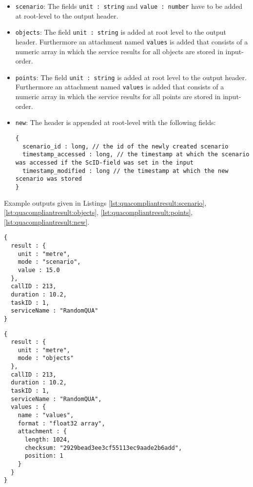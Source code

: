 \begin{itemize}
  \item \texttt{scenario}: The fields \texttt{unit : string} and \texttt{value : number} have to be added at root-level to the output header.

  \item \texttt{objects}: The field \texttt{unit : string} is added at root level to the output header. Furthermore an attachment named \texttt{values} is added that consists of a numeric array in which the service results for all objects are stored in input-order.

  \item \texttt{points}: The field \texttt{unit : string} is added at root level to the output header. Furthermore an attachment named \texttt{values} is added that consists of a numeric array in which the service results for all points are stored in input-order.

  \item \texttt{new}: The header is appended at root-level with the following fields:
  \begin{lstlisting}
{
  scenario_id : long, // the id of the newly created scenario
  timestamp_accessed : long, // the timestamp at which the scenario was accessed if the ScID-field was set in the input
  timestamp_modified : long // the timestamp at which the new scenario was stored
}
  \end{lstlisting}
\end{itemize}

Example outputs given in Listings \ref{lst:quacompliantresult:scenario}, \ref{lst:quacompliantresult:objects}, \ref{lst:quacompliantresult:points}, \ref{lst:quacompliantresult:new}.

\begin{lstlisting}[caption={A qua-compliant service output for mode \texttt{scenario}}, label={lst:quacompliantresult:scenario}]
{
  result : {
    unit : "metre",
    mode : "scenario",
    value : 15.0
  },
  callID : 213,
  duration : 10.2,
  taskID : 1,
  serviceName : "RandomQUA"
}
\end{lstlisting}

\begin{lstlisting}[caption={A qua-compliant service output for mode \texttt{objects}}, label={lst:quacompliantresult:objects}]
{
  result : {
    unit : "metre",
    mode : "objects"
  },
  callID : 213,
  duration : 10.2,
  taskID : 1,
  serviceName : "RandomQUA",
  values : {
    name : "values",
    format : "float32 array",
    attachment : {
      length: 1024,
      checksum: "2929bead3ee3cf55113ec9aade2b6add",
      position: 1
    }
  }
}
\end{lstlisting}

